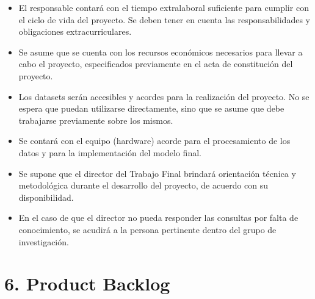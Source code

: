 \documentclass[
11pt, %
]{charter}
\begin{document}
\begin{itemize}
	\item El responsable contará con el tiempo extralaboral suficiente para cumplir con el ciclo de vida del proyecto. Se deben tener en cuenta
	las	responsabilidades y obligaciones extracurriculares.
	\item Se asume que se cuenta con los recursos económicos necesarios para llevar a cabo el proyecto, especificados previamente 
	en el acta de constitución del proyecto.
	\item Los datasets serán accesibles y acordes para la realización del proyecto. No se espera que puedan utilizarse directamente, sino que
	se asume que debe trabajarse previamente sobre los mismos.
	\item Se contará con el equipo (hardware) acorde para el procesamiento de los datos y para la implementación del modelo final.
	\item Se supone que el director del Trabajo Final brindará orientación técnica y metodológica durante el desarrollo del proyecto, 
  de acuerdo con su disponibilidad.
  \item En el caso de que el director no pueda responder las consultas por falta de conocimiento, se acudirá a la persona pertinente dentro 
  del grupo de investigación.
\end{itemize}

\section{6. Product Backlog}
\label{sec:backlog}
\end{document}
